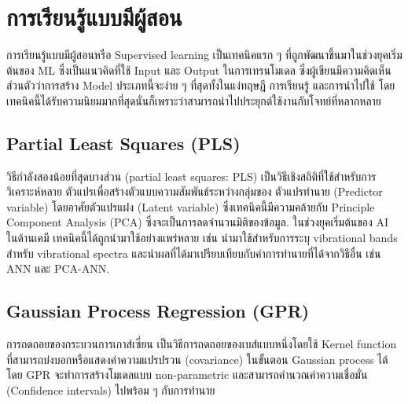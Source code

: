 

\chapter{การเรียนรู้แบบมีผู้สอน}
\label{ch:sup_ml}

การเรียนรู้แบบมีผู้สอนหรือ Supervised learning เป็นเทคนิคแรก ๆ ที่ถูกพัฒนาขึ้นมาในช่วงยุคเริ่มต้นของ ML ซึ่งเป็นแนวคิดที่ใช้ Input และ 
Output ในการเทรนโมเดล ซึ่งผู้เขียนมีความคิดเห็นส่วนตัวว่าการสร้าง Model ประเภทนี้จะง่าย ๆ ที่สุดทั้งในแง่ทฤษฎี การเรียนรู้ และการนำไปใช้ 
โดยเทคนิคนี้ได้รับความนิยมมากที่สุดนั่นก็เพราะว่าสามารถนำไปประยุกต์ใช้งานกับโจทย์ที่หลากหลาย

\section{Partial Least Squares (PLS)}

วิธีกำลังสองน้อยที่สุดบางส่วน (partial least squares: PLS) 
เป็นวิธีเชิงสถิติที่ใช้สำหรับการวิเคราะห์หลาย ตัวแปรเพื่อสร้างตัวแบบความสัมพันธ์ระหว่างกลุ่มของ ตัวแปรทำนาย (Predictor variable) 
โดยอาศัยตัวแปรแฝง (Latent variable) ซึ่งเทคนิคนี้มีความคล้ายกับ Principle Component Analysis (PCA) 
ซึ่งจะเป็นการลดจำนวนมิติของข้อมูล.\cite{wold1984} ในช่วงยุคเริ่มต้นของ AI ในด้านเคมี เทคนิคนี้ได้ถูกนำมาใช้อย่างแพร่หลาย เช่น 
นำมาใช้สำหรับการระบุ vibrational bands สำหรับ vibrational spectra และนำผลที่ได้มาเปรียบเทียบกับค่าการทำนายที่ได้จากวิธีอื่น เช่น
ANN และ PCA-ANN.

\section{Gaussian Process Regression (GPR)}

การถดถอยของกระบวนการเกาส์เซี่ยน เป็นวิธีการถดถอยของเบส์แบบหนึ่งโดยใช้ Kernel function ที่สามารถบ่งบอกหรือแสดงค่าความแปรปรวน (covariance) 
ในขั้นตอน Gaussian process ได้\cite{rasmussen2005} โดย GPR จะทำการสร้างโมเดลแบบ non-parametric และสามารถคำนวณค่าความเชื่อมั่น 
(Confidence intervals) ไปพร้อม ๆ กับการทำนาย

